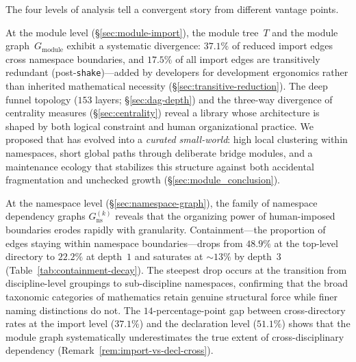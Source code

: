 The four levels of analysis tell a convergent story from different vantage points.

At the module level (\S\ref{sec:module-import}), the module tree~$T$ and the module graph~$G_{\mathrm{module}}$ exhibit a systematic divergence: $37.1\%$ of reduced import edges cross namespace boundaries, and $17.5\%$ of all import edges are transitively redundant (post-\texttt{shake})---added by developers for development ergonomics rather than inherited mathematical necessity (\S\ref{sec:transitive-reduction}). The deep funnel topology ($153$ layers; \S\ref{sec:dag-depth}) and the three-way divergence of centrality measures (\S\ref{sec:centrality}) reveal a library whose architecture is shaped by both logical constraint and human organizational practice. We proposed that  has evolved into a \emph{curated small-world}: high local clustering within namespaces, short global paths through deliberate bridge modules, and a maintenance ecology that stabilizes this structure against both accidental fragmentation and unchecked growth (\S\ref{sec:module_conclusion}).

At the namespace level (\S\ref{sec:namespace-graph}), the family of namespace dependency graphs $G_{\mathrm{ns}}^{(k)}$ reveals that the organizing power of human-imposed boundaries erodes rapidly with granularity. Containment---the proportion of edges staying within namespace boundaries---drops from $48.9\%$ at the top-level directory to $22.2\%$ at depth~$1$ and saturates at ${\sim}13\%$ by depth~$3$ (Table~\ref{tab:containment-decay}). The steepest drop occurs at the transition from discipline-level groupings to sub-discipline namespaces, confirming that the broad taxonomic categories of mathematics retain genuine structural force while finer naming distinctions do not. The $14$-percentage-point gap between cross-directory rates at the import level ($37.1\%$) and the declaration level ($51.1\%$) shows that the module graph systematically underestimates the true extent of cross-disciplinary dependency (Remark~\ref{rem:import-vs-decl-cross}).

